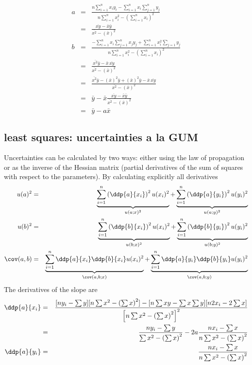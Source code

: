 \begin{eqnarray*}
 a &=& \frac{n \sum_{i=1}^n x_i y_i - \sum_{i=1}^n x_i \sum_{j=1}^n y_j}{ n \sum_{i=1}^n x_i^2 - \left( \sum_{i=1}^n x_i \right)^2} \\
 &=& \frac{ \overline{xy} -  \bar x\bar y }{ \overline{x^2} - \left( \bar x\right)^2} \\
 b &=& \frac{-\sum_{i=1}^n x_i\sum_{j=1}^n x_j y_j + \sum_{i=1}^n x_i^2 \sum_{j=1} y_j}{ n \sum_{i=1}^n x_i^2 - \left( \sum_{i=1}^n x_i \right)^2} \\
 &=& \frac{ \overline{x^2} \bar y - \bar x \, \overline{xy}}{\overline{x^2} - \left( \bar x\right)^2}\\
 &=& \frac{ \overline{x^2} \bar y - \left(\bar x\right)^2 \bar y + \left(\bar x\right)^2 \bar y - \bar x \, \overline{xy}}{\overline{x^2} - \left( \bar x\right)^2}\\
 &=& \bar y - \bar x \frac{\overline{xy} - \bar x \bar y }{\overline{x^2} - \left( \bar x\right)^2} \\
 &=&\bar y - a \bar x 
\end{eqnarray*}

\subsection{least squares: uncertainties a la GUM}
Uncertainties can be calculated by two ways: either using the law of propagation or as the inverse of the Hessian matrix (partial derivatives of the sum of squares with respect to the parameters).
By calculating explicitly all derivatives
\begin{eqnarray}
 u(a)^2 &=& \underbrace{\sum_{i=1}^n \left(\ddp{a}{x_i}\right)^2 u(x_i)^2}_{u(a;x)^2} + \underbrace{\sum_{i=1}^n \left(\ddp{a}{y_i}\right)^2 u(y_i)^2}_{u(a;y)^2} \\
 u(b)^2 &=& \underbrace{\sum_{i=1}^n \left(\ddp{b}{x_i}\right)^2 u(x_i)^2}_{u(b;x)^2} + \underbrace{\sum_{i=1}^n \left(\ddp{b}{y_i}\right)^2 u(y_i)^2}_{u(b;y)^2} \\
 \cov(a,b) &=& \underbrace{ \sum_{i=1}^n \ddp{a}{x_i} \ddp{b}{x_i} u(x_i)^2 }_{\cov(a,b;x)} + \underbrace{\sum_{i=1}^n \ddp{a}{y_i} \ddp{b}{y_i} u(y_i)^2}_{\cov(a,b;y)}
 \end{eqnarray}
The derivatives of the slope are
\begin{eqnarray*}
 \ddp{a}{x_i} &=& \frac{[n y_i - \sum y][n \sum x^2 - \left( \sum x\right)^2] -[n \sum xy - \sum x \sum y][n 2 x_i - 2 \sum x]}{\left[ n \sum x^2 - \left( \sum x\right)^2 \right]^2} \\
 &=& \frac{n y_i - \sum y}{\sum x^2 - \left( \sum x\right)^2} - 2a \frac{n x_i - \sum x}{n \sum x^2 - \left( \sum x\right)^2} \\
 \ddp{a}{y_i} &=& \frac{n x_i - \sum x}{n \sum x^2 - \left( \sum x\right)^2}
 \end{eqnarray*}

